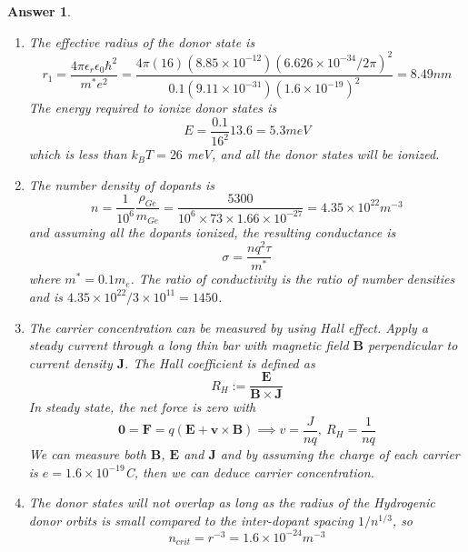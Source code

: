 \documentclass[a4paper]{article}
\newtheorem{ans}{Answer}[subsection]
\theoremstyle{new}
\begin{document}
\begin{ans}
\begin{enumerate}[label=(\roman*)]
When an n-type semiconductor is placed next to a p-type semiconductor, the differences in chemical potentials causes charge to flow until an electric dipole is formed at the surface, creating a contact potential to prevent any further net flow of charge.
\item The effective radius of the donor state is
$$r_1=\frac{4\pi\epsilon_r\epsilon_0\hbar^2}{m^*e^2}=\frac{4\pi(16)(8.85\times10^{-12})(6.626\times10^{-34}/2\pi)^2}{0.1(9.11\times10^{-31})(1.6\times10^{-19})^2}=8.49 nm$$
The energy required to ionize donor states is
$$E=\frac{0.1}{16^2}13.6=5.3meV$$
which is less than $k_BT=26$ meV, and all the donor states will be ionized.
\item The number density of dopants is
$$n=\frac{1}{10^6}\frac{\rho_{Ge}}{m_{Ge}}=\frac{5300}{10^6\times 73\times 1.66\times10^{-27}}=4.35\times10^{22}m^{-3}$$
and assuming all the dopants ionized, the resulting conductance is
$$\sigma=\frac{nq^2\tau}{m^*}$$
where $m^*=0.1m_e$. The ratio of conductivity is the ratio of number densities and is $4.35\times10^{22}/3\times10^{11}=1450$.
\item The carrier concentration can be measured by using Hall effect. Apply a steady current through a long thin bar with magnetic field $\mathbf{B}$ perpendicular to current density $\mathbf{J}$. The Hall coefficient is defined as
$$R_H:=\frac{\mathbf{E}}{\mathbf{B}\times\mathbf{J}}$$
In steady state, the net force is zero with
$$\boldsymbol{0}=\mathbf{F}=q(\mathbf{E}+\mathbf{v}\times\mathbf{B})\implies v=\frac{J}{nq},~R_H=\frac{1}{nq}$$
We can measure both $\mathbf{B}$, $\mathbf{E}$ and $\mathbf{J}$ and by assuming the charge of each carrier is $e=1.6\times10^{-19}$C, then we can deduce carrier concentration.
\item The donor states will not overlap as long as the radius of the Hydrogenic donor orbits is small compared to the inter-dopant spacing $1/n^{1/3}$, so 
$$n_{crit}=r^{-3}=1.6\times10^{-24}m^{-3}$$


\end{enumerate}
\end{ans}
\newpage
\end{document}
